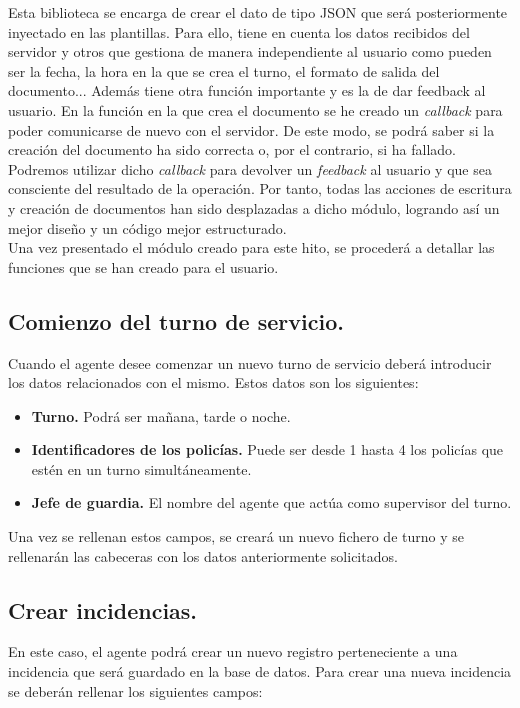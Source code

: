 Esta biblioteca se encarga de crear el dato de tipo JSON que será posteriormente inyectado en las plantillas. Para ello, tiene en cuenta los datos recibidos
del servidor y otros que gestiona de manera independiente al usuario como pueden ser la fecha, la hora en la que se crea el turno, el formato de salida del 
documento... Además tiene otra función importante y es la de dar feedback al usuario. En la función en la que crea el documento se he creado un \textit{callback}
para poder comunicarse de nuevo con el servidor. De este modo, se podrá saber si la creación del documento ha sido correcta o, por el contrario, si ha fallado.
Podremos utilizar dicho \textit{callback} para devolver un \textit{feedback} al usuario y que sea consciente del resultado de la operación. Por tanto, todas las 
acciones de escritura y creación de documentos han sido desplazadas a dicho módulo, logrando así un mejor diseño y un código mejor estructurado.
\\

Una vez presentado el módulo creado para este hito, se procederá a detallar las funciones que se han creado para el usuario.

\subsection{Comienzo del turno de servicio.}
Cuando el agente desee comenzar un nuevo turno de servicio deberá introducir los datos relacionados con el mismo. Estos datos son los siguientes:

\begin{itemize}
	\item \textbf{Turno.} Podrá ser mañana, tarde o noche.
	\item \textbf{Identificadores de los policías.} Puede ser desde 1 hasta 4 los policías que estén en un turno simultáneamente.
	\item \textbf{Jefe de guardia.} El nombre del agente que actúa como supervisor del turno.
\end{itemize}

Una vez se rellenan estos campos, se creará un nuevo fichero de turno y se rellenarán las cabeceras con los datos anteriormente solicitados.

\subsection{Crear incidencias.}

En este caso, el agente podrá crear un nuevo registro perteneciente a una incidencia que será guardado en la base de datos. Para crear una nueva
incidencia se deberán rellenar los siguientes campos:

